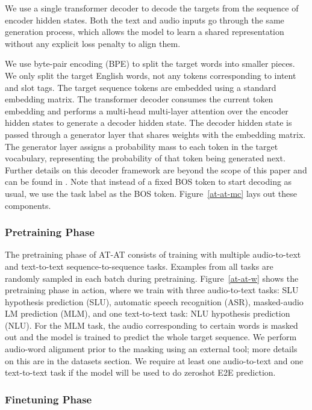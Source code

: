 \documentclass[letterpaper]{article} \usepackage{aaai21}  \usepackage{times}  \usepackage{helvet} \usepackage{courier}  \usepackage[hyphens]{url}  \usepackage{graphicx} \usepackage{booktabs}
\begin{document}
We use a single transformer decoder to decode the targets from the sequence of encoder hidden states. Both the text and audio inputs go through the same generation process, which allows the model to learn a shared representation without any explicit loss penalty to align them.

We use byte-pair encoding (BPE) to split the target words into smaller pieces. We only split the target English words, not any tokens corresponding to intent and slot tags. The target sequence tokens are embedded using a standard embedding matrix. The transformer decoder consumes the current token embedding and performs a multi-head multi-layer attention over the encoder hidden states to generate a decoder hidden state. The decoder hidden state is passed through a generator layer that shares weights with the embedding matrix. The generator layer assigns a probability mass to each token in the target vocabulary, representing the probability of that token being generated next. Further details on this decoder framework are beyond the scope of this paper and can be found in \cite{vaswani2017attention}. Note that instead of a fixed BOS token to start decoding as usual, we use the task label as the BOS token. Figure~\ref{at-at-mc} lays out these components.

\subsubsection{Pretraining Phase}

The pretraining phase of AT-AT consists of training with multiple audio-to-text and text-to-text sequence-to-sequence tasks. Examples from all tasks are randomly sampled in each batch during pretraining. Figure~\ref{at-at-w} shows the pretraining phase in action, where we train with three audio-to-text tasks: SLU hypothesis prediction (SLU), automatic speech recognition (ASR), masked-audio LM prediction (MLM), and one text-to-text task: NLU hypothesis prediction (NLU). For the MLM task, the audio corresponding to certain words is masked out and the model is trained to predict the whole target sequence. We perform audio-word alignment prior to the masking using an external tool; more details on this are in the datasets section. We require at least one audio-to-text and one text-to-text task if the model will be used to do zeroshot E2E prediction.

\subsubsection{Finetuning Phase}
\end{document}

